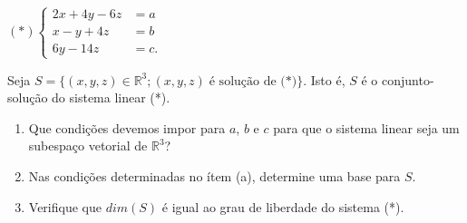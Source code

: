 \begin{enumerate}
$ (*) \left\{ \begin{array}{rr}
2x+4y-6z&=a\\
x-y+4z&=b \\
6y-14z&=c .
\end{array}\right.$


Seja $S=\{ (x, y, z) \in\mathbb{R}^3; (x,y,z)\; \text{é solução  de (*)} \}$. Isto é, $S$ é o conjunto-solução do sistema linear (*).
\begin{enumerate}[label=(\alph*)]
\item Que condições devemos impor para $a$, $b$ e $c$ para que o sistema linear seja um subespaço vetorial de  $\mathbb{R}^3$?
\item Nas condições determinadas no ítem (a), determine uma base para $S$.
\item Verifique que  $dim(S)$ é igual ao grau de liberdade do sistema (*).
\end{enumerate}





\end{enumerate}
